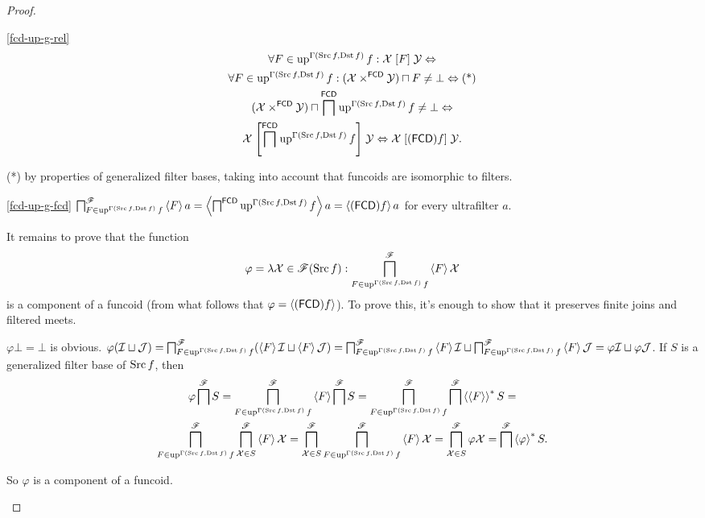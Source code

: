 \begin{proof}
~
\begin{widedisorder}
\item [{\ref{fcd-up-g-rel}}] ~
\begin{multline*}
\forall F\in\operatorname{up}^{\Gamma(\operatorname{Src} f,\operatorname{Dst} f)}f:\mathcal{X}\mathrel{\left[F\right]}\mathcal{Y}\Leftrightarrow\\
\forall F\in\operatorname{up}^{\Gamma(\operatorname{Src} f,\operatorname{Dst} f)}f:(\mathcal{X}\times^{\mathsf{FCD}}\mathcal{Y})\sqcap F\ne\bot\Leftrightarrow\text{(*)}\\
(\mathcal{X}\times^{\mathsf{FCD}}\mathcal{Y})\sqcap \bigsqcap^{\mathsf{FCD}}\operatorname{up}^{\Gamma(\operatorname{Src} f,\operatorname{Dst} f)}f\ne\bot\Leftrightarrow\\
\mathcal{X}\mathrel{\left[\bigsqcap^{\mathsf{FCD}}\operatorname{up}^{\Gamma(\operatorname{Src} f,\operatorname{Dst} f)}f\right]}\mathcal{Y}\Leftrightarrow\mathcal{X}\mathrel{\left[(\mathsf{FCD}) f\right]}\mathcal{Y}.
\end{multline*}



({*}) by properties of generalized filter bases, taking into account
that funcoids are isomorphic to filters.

\item [{\ref{fcd-up-g-fcd}}] $\bigsqcap_{F\in\operatorname{up}^{\Gamma(\operatorname{Src} f,\operatorname{Dst} f)}f}^{\mathscr{F}}\left\langle F\right\rangle a=\left\langle \bigsqcap^{\mathsf{FCD}}\operatorname{up}^{\Gamma(\operatorname{Src} f,\operatorname{Dst} f)}f\right\rangle a=\left\langle (\mathsf{FCD}) f\right\rangle a$
for every ultrafilter $a$.


It remains to prove that the function 
\[
\varphi=\lambda\mathcal{X}\in\mathscr{F}(\operatorname{Src} f):\bigsqcap_{F\in\operatorname{up}^{\Gamma(\operatorname{Src} f,\operatorname{Dst} f)}f}^{\mathscr{F}}\left\langle F\right\rangle\mathcal{X}
\]
is a component of a funcoid (from what follows that $\varphi=\left\langle (\mathsf{FCD}) f\right\rangle$).
To prove this, it's enough to show that it preserves finite joins
and filtered meets.


$\varphi\bot=\bot$ is obvious. $\varphi(\mathcal{I}\sqcup\mathcal{J})=\bigsqcap_{F\in\operatorname{up}^{\Gamma(\operatorname{Src} f,\operatorname{Dst} f)}f}^{\mathscr{F}}(\left\langle F\right\rangle\mathcal{I}\sqcup\left\langle F\right\rangle\mathcal{J})=\bigsqcap_{F\in\operatorname{up}^{\Gamma(\operatorname{Src} f,\operatorname{Dst} f)}f}^{\mathscr{F}}\left\langle F\right\rangle\mathcal{I}\sqcup\bigsqcap_{F\in\operatorname{up}^{\Gamma(\operatorname{Src} f,\operatorname{Dst} f)}f}^{\mathscr{F}}\left\langle F\right\rangle\mathcal{J}=\varphi\mathcal{I}\sqcup\varphi\mathcal{J}$.
If $S$ is a generalized filter base of $\operatorname{Src} f$, then 
\begin{multline*}
\varphi\bigsqcap^{\mathscr{F}}S=\bigsqcap_{F\in\operatorname{up}^{\Gamma(\operatorname{Src} f,\operatorname{Dst} f)}f}^{\mathscr{F}}\left\langle F\right\rangle\bigsqcap^{\mathscr{F}}S=\bigsqcap_{F\in\operatorname{up}^{\Gamma(\operatorname{Src} f,\operatorname{Dst} f)}f}^{\mathscr{F}}\bigsqcap^{\mathscr{F}}\left\langle \left\langle F\right\rangle\right\rangle ^{\ast}S=\\
\bigsqcap_{F\in\operatorname{up}^{\Gamma(\operatorname{Src} f,\operatorname{Dst} f)}f}^{\mathscr{F}}\bigsqcap_{\mathcal{X}\in S}^{\mathscr{F}}\left\langle F\right\rangle\mathcal{X}=\bigsqcap_{\mathcal{X}\in S}^{\mathscr{F}}\bigsqcap_{F\in\operatorname{up}^{\Gamma(\operatorname{Src} f,\operatorname{Dst} f)}f}^{\mathscr{F}}\left\langle F\right\rangle\mathcal{X}=\bigsqcap_{\mathcal{X}\in S}^{\mathscr{F}}\varphi\mathcal{X}=\bigsqcap^{\mathscr{F}}\left\langle \varphi\right\rangle ^{\ast}S.
\end{multline*}



So $\varphi$ is a component of a funcoid.

\end{widedisorder}
\end{proof}
